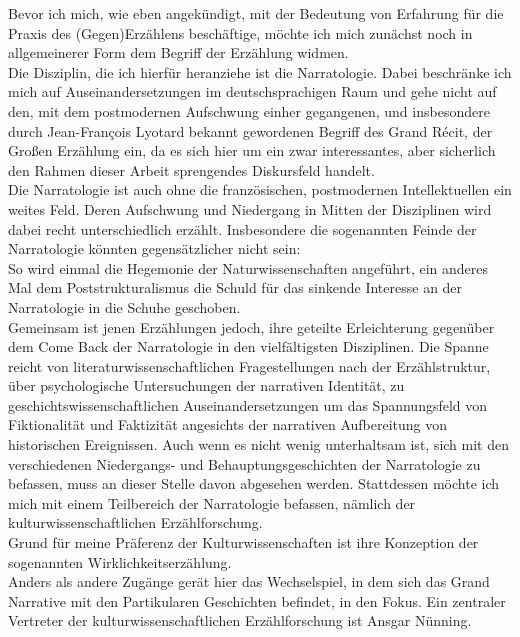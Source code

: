 \noindent Bevor ich mich, wie eben angekündigt, mit der Bedeutung von Erfahrung für die
Praxis des (Gegen)Erzählens beschäftige, möchte ich mich zunächst noch in
allgemeinerer Form dem Begriff der Erzählung widmen.\\
Die Disziplin, die ich hierfür heranziehe ist die Narratologie. Dabei
beschränke ich mich auf Auseinandersetzungen im deutschsprachigen Raum und gehe
nicht auf den, mit dem postmodernen Aufschwung einher gegangenen, und
insbesondere durch Jean-François Lyotard bekannt gewordenen Begriff des Grand
Récit, der Großen Erzählung ein, da es sich hier um ein zwar interessantes,
aber sicherlich den Rahmen dieser Arbeit sprengendes Diskursfeld handelt.\\

\noindent Die Narratologie ist auch ohne die französischen, postmodernen Intellektuellen
ein weites Feld. Deren Aufschwung und Niedergang in Mitten der Disziplinen wird
dabei recht unterschiedlich erzählt. Insbesondere die sogenannten Feinde der
Narratologie könnten gegensätzlicher nicht sein: \\
So wird einmal die Hegemonie
der Naturwissenschaften\footnotemark {} angeführt, ein anderes Mal dem Poststrukturalismus die
Schuld für das sinkende Interesse an der Narratologie in die Schuhe
geschoben\footnotemark {}. \\
Gemeinsam ist jenen Erzählungen jedoch, ihre geteilte Erleichterung
gegenüber dem Come Back der Narratologie in den vielfältigsten Disziplinen. Die
Spanne reicht von literaturwissenschaftlichen Fragestellungen nach der
Erzählstruktur, über psychologische Untersuchungen der narrativen Identität, zu
geschichtswissenschaftlichen Auseinandersetzungen um das Spannungsfeld von
Fiktionalität und Faktizität angesichts der narrativen Aufbereitung von
historischen Ereignissen. Auch wenn es nicht wenig unterhaltsam ist, sich mit
den verschiedenen Niedergangs- und Behauptungsgeschichten der Narratologie zu
befassen, muss an dieser Stelle davon abgesehen werden. Stattdessen möchte ich
mich mit einem Teilbereich der Narratologie befassen, nämlich der
kulturwissenschaftlichen Erzählforschung. \\
Grund für meine Präferenz der
Kulturwissenschaften ist ihre Konzeption der sogenannten
\glqq Wirklichkeitserzählung\grqq\footnotemark {}. \\
Anders als andere Zugänge gerät hier das
Wechselspiel, in dem sich das Grand Narrative mit den Partikularen Geschichten
befindet, in den Fokus. Ein zentraler Vertreter der kulturwissenschaftlichen 
Erzählforschung ist Ansgar Nünning.\\

